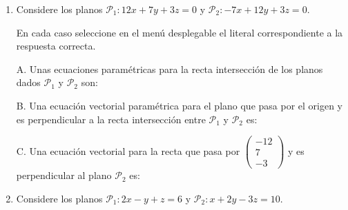 \documentclass[11pt]{article}
\newcommand{\vectiii}[3]{\begin{pmatrix}#1\\#2\\#3\end{pmatrix}}
\begin{document}
\begin{enumerate}
\item[\textbf{Punto 10.}] Considere los planos $\mathcal{P}_1: 12x+7y+3z=0$ y $\mathcal{P}_2: -7x+12y+3z=0$.

En cada caso seleccione en el menú desplegable el literal correspondiente a la respuesta correcta.

A. Unas ecuaciones paramétricas para la recta intersección de los planos dados $\mathcal{P}_1$ y $\mathcal{P}_2$ son:

B. Una ecuación vectorial paramétrica para el plano que pasa por el origen y es perpendicular a la recta intersección entre $\mathcal{P}_1$ y $\mathcal{P}_2$ es:

C. Una ecuación vectorial para la recta que pasa por $\vectiii{-12}{7}{-3}$ y es perpendicular al plano $\mathcal{P}_2$ es:

\item[\textbf{Punto 11.}] Considere los planos $\mathcal{P}_1: 2x-y+z=6$ y $\mathcal{P}_2: x+2y-3z=10$.


\end{enumerate}
\end{document}
